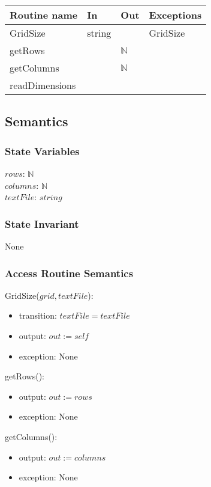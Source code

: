 \documentclass[12pt]{article}
\begin{document}
\begin{tabular}{| l | l | l | l |}
\hline
\textbf{Routine name} & \textbf{In} & \textbf{Out} & \textbf{Exceptions}\\
\hline
GridSize & string & ~ & GridSize\\
\hline
getRows & ~ & $\mathbb{N}$ & ~\\
\hline
getColumns & ~ & $\mathbb{N}$ & ~\\
\hline
readDimensions & ~ & ~ & ~\\
\hline
\end{tabular}

\subsection* {Semantics}

\subsubsection* {State Variables}

$rows$: $\mathbb{N}$\\
$columns$:  $\mathbb{N}$\\
$textFile$: $string$


\subsubsection* {State Invariant}

None

\subsubsection* {Access Routine Semantics}

GridSize($grid, textFile$):
\begin{itemize}
\item transition: $textFile = textFile$
\item output: $out := \mathit{self}$
\item exception: None
\end{itemize}

\noindent getRows():
\begin{itemize}
\item output: $out := rows$
\item exception: None
\end{itemize}

\noindent getColumns():
\begin{itemize}
\item output: $out := columns$
\item exception: None
\end{itemize}
\end{document}
